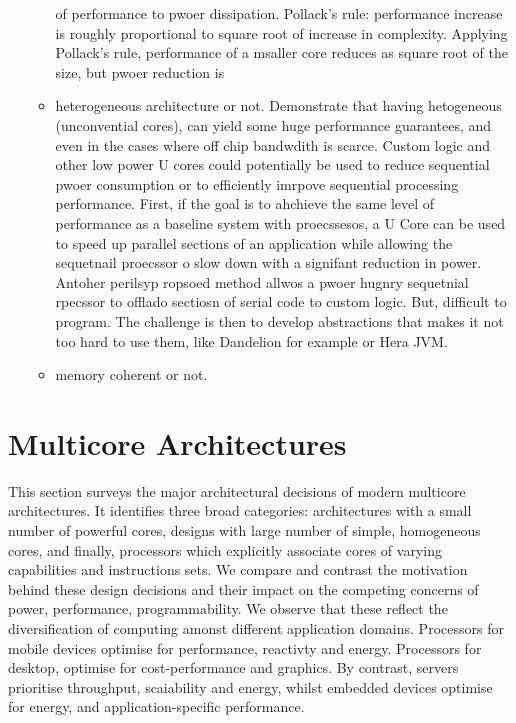 \begin{itemize}
\begin{itemize}
of performance to pwoer dissipation. 
Pollack's rule: performance increase is roughly proportional to square root 
of increase in complexity. Applying Pollack's rule, 
performance of a msaller core reduces as square root of the size, but pwoer reduction is 
\item heterogeneous architecture or not. Demonstrate that having hetogeneous
(unconvential cores), can yield some huge performance guarantees, and 
even in the cases where off chip bandwdith is scarce. 
Custom logic and other low power U cores could potentially be used to
reduce sequential pwoer consumption or to efficiently 
imrpove sequential processing performance. First, if the goal is to ahchieve the same level of performance as a baseline system with proecssesos, a U Core can be used to speed up parallel sections of an application while allowing the sequetnail proecssor o slow down with a signifant reduction in power. Antoher perilsyp ropsoed method allwos a pwoer hugnry sequetnial rpecssor to offlado sectiosn of serial code to custom logic. 
But, difficult to program. The challenge is then to develop abstractions that makes it
not too hard to use them, like Dandelion for example or Hera JVM. 
\item memory coherent or not. 
\end{itemize}
\end{itemize}

\pagebreak 

\section{Multicore Architectures}
This section surveys the major architectural decisions of modern multicore 
architectures. It identifies three broad categories:
architectures with a small number of powerful cores, designs with large number of simple, homogeneous cores, and
finally, processors which explicitly associate
cores of varying capabilities and instructions sets.
We compare and contrast the motivation behind these
design decisions and their impact on the competing
concerns of power, performance, programmability.
We observe that these reflect the diversification of computing
amonst different application domains. Processors for mobile devices
optimise for performance, reactivty and energy. Processors for desktop, 
optimise for cost-performance and  graphics. By contrast,
servers prioritise throughput, scaiability and energy, whilst
embedded devices optimise for energy, and application-specific
performance. 

